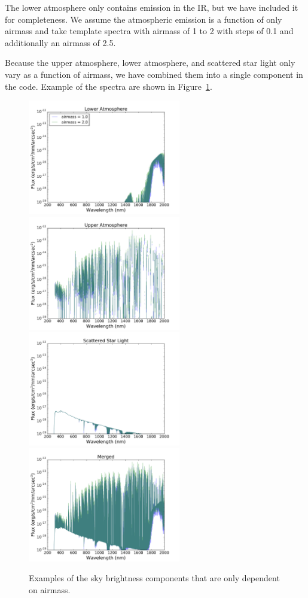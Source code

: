 \documentclass[]{spie}
\begin{document}
The lower atmosphere only contains emission in the IR, but we have included it for completeness.  We assume the atmospheric emission is a function of only airmass and take template spectra with airmass of 1 to 2 with steps of 0.1 and additionally an airmass of 2.5.

Because the upper atmosphere, lower atmosphere, and scattered star light only vary as a function of airmass, we have combined them into a single component in the code. Example of the spectra are shown in Figure~\ref{fig:merged}.


\begin{figure}[ht]
  \begin{center}
  \includegraphics[height=5cm]{plots/merged0.pdf}\includegraphics[height=5cm]{plots/merged1.pdf} \\
  \includegraphics[height=5cm]{plots/merged2.pdf}\includegraphics[height=5cm]{plots/merged3.pdf}
  \end{center}
  \caption{Examples of the sky brightness components that are only dependent on airmass. \label{fig:merged}}
\end{figure}
\end{document}
